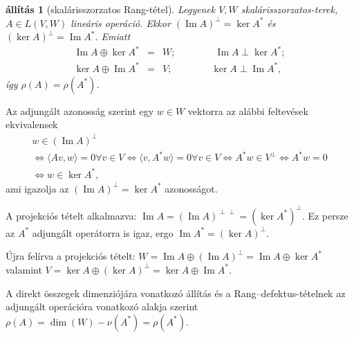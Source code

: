 \documentclass[a4paper, showtrims]{memoir}
\makeatletter
\renewenvironment{proof}[1][\proofname]
    {\par\pushQED{\qed}%
    \normalfont \topsep6\p@\@plus6\p@\relax
    \trivlist
    \item[\hskip\labelsep
        \itshape
    #1\@addpunct{:}]\ignorespaces}
    {\popQED\endtrivlist\@endpefalse}
\theoremstyle{plain}
\newtheorem{proposition}{állítás}[chapter]
\theoremstyle{remark}
\theoremstyle{definition}
\DeclareMathOperator{\im}{Im}
\newcommand{\ip}[2]{\langle#1,#2\rangle}
\makeatother
\begin{document}
\begin{proposition}[skalárisszorzatos Rang-tétel]\label{pr:skrang}
	Legyenek $V,W$ skalárisszorzatos-terek, $A\in L\left( V,W \right)$ lineáris operáció.
	Ekkor
	$(\im A)^\perp=\ker A^\ast$ és
	$(\ker A)^\perp=\im A^\ast.$
	Emiatt
	\begin{eqnarray*}
		\im A\oplus\ker A^\ast&=& W;\qquad\qquad\im A\perp\ker A^\ast;\\
		\ker A\oplus\im A^\ast&=& V;\qquad\qquad\ker A\perp\im A^\ast,
	\end{eqnarray*}
	így $\rho\left( A \right)=\rho\left( A^\ast \right)$.
\end{proposition}
\begin{proof}
	Az adjungált azonosság szerint egy $w\in W$ vektorra az alábbi feltevések ekvivalensek
	\begin{multline*}
		w\in\left( \im A \right)^\perp
		\\
		\iff
		\ip{Av}{w}=0 \forall v\in V
		\iff
		\ip{v}{A^\ast w}=0 \forall v\in V
		\iff
		A^\ast w\in V^\perp
		\iff
		A^\ast w=0
		\\
		\iff
		w\in\ker A^\ast,
	\end{multline*}
	ami igazolja az $\left( \im A \right)^\perp=\ker A^\ast$ azonosságot.

	A projekciós tételt alkalmazva:
	\begin{math}
		\im A=(\im A)^{\perp\perp}=(\ker A^\ast)^\perp
	\end{math}.
	Ez persze az $A^\ast$ adjungált operátorra is igaz,
	ergo
	\begin{math}
		\im A^\ast = \left( \ker A \right)^\perp.
	\end{math}

	Újra felírva a projekciós tételt:
	\begin{math}
		W=\im A\oplus\left( \im A \right)^\perp
		=\im A\oplus\ker A^\ast
	\end{math}
	valamint
	\begin{math}
		V=\ker A\oplus\left( \ker A \right)^\perp
		=
		\ker A\oplus\im A^\ast.
	\end{math}

	A direkt összegek dimenziójára vonatkozó állítás és a Rang--defektus-tételnek az adjungált operációra vonatkozó alakja szerint
	\begin{math}
		\rho\left( A \right)=\dim(W)-\nu\left( A^\ast \right)=\rho\left( A^\ast \right).
	\end{math}
\end{proof}
\end{document}
